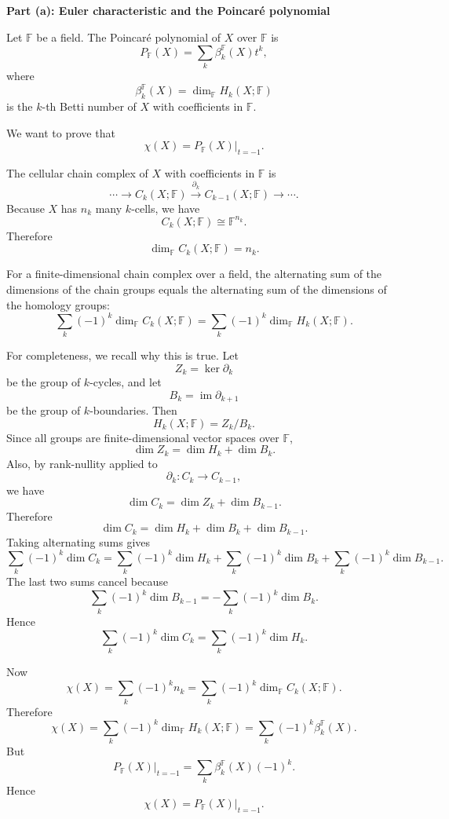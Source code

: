 \begin{solution}

\medskip
\noindent\textbf{Part (a): Euler characteristic and the Poincaré polynomial}\par
\smallskip


Let \(\mathbb F\) be a field. The Poincaré polynomial of \(X\) over \(\mathbb F\) is
\[
P_{\mathbb F}(X)
=
\sum_k \beta_k^{\mathbb F}(X)t^k,
\]
where
\[
\beta_k^{\mathbb F}(X)
=
\dim_{\mathbb F} H_k(X;\mathbb F)
\]
is the \(k\)-th Betti number of \(X\) with coefficients in \(\mathbb F\).

We want to prove that
\[
\chi(X)=P_{\mathbb F}(X)\big|_{t=-1}.
\]

The cellular chain complex of \(X\) with coefficients in \(\mathbb F\) is
\[
\cdots
\longrightarrow
C_k(X;\mathbb F)
\xrightarrow{\partial_k}
C_{k-1}(X;\mathbb F)
\longrightarrow
\cdots.
\]
Because \(X\) has \(n_k\) many \(k\)-cells, we have
\[
C_k(X;\mathbb F)\cong \mathbb F^{n_k}.
\]
Therefore
\[
\dim_{\mathbb F} C_k(X;\mathbb F)=n_k.
\]

For a finite-dimensional chain complex over a field, the alternating sum of the dimensions of the chain groups equals the alternating sum of the dimensions of the homology groups:
\[
\sum_k (-1)^k \dim_{\mathbb F} C_k(X;\mathbb F)
=
\sum_k (-1)^k \dim_{\mathbb F} H_k(X;\mathbb F).
\]

For completeness, we recall why this is true. Let
\[
Z_k=\ker \partial_k
\]
be the group of \(k\)-cycles, and let
\[
B_k=\operatorname{im}\partial_{k+1}
\]
be the group of \(k\)-boundaries. Then
\[
H_k(X;\mathbb F)=Z_k/B_k.
\]
Since all groups are finite-dimensional vector spaces over \(\mathbb F\),
\[
\dim Z_k=\dim H_k+\dim B_k.
\]
Also, by rank-nullity applied to
\[
\partial_k:C_k\to C_{k-1},
\]
we have
\[
\dim C_k=\dim Z_k+\dim B_{k-1}.
\]
Therefore
\[
\dim C_k
=
\dim H_k+\dim B_k+\dim B_{k-1}.
\]
Taking alternating sums gives
\[
\sum_k (-1)^k \dim C_k
=
\sum_k (-1)^k \dim H_k
+
\sum_k (-1)^k \dim B_k
+
\sum_k (-1)^k \dim B_{k-1}.
\]
The last two sums cancel because
\[
\sum_k (-1)^k \dim B_{k-1}
=
-\sum_k (-1)^k \dim B_k.
\]
Hence
\[
\sum_k (-1)^k \dim C_k
=
\sum_k (-1)^k \dim H_k.
\]

Now
\[
\chi(X)
=
\sum_k (-1)^k n_k
=
\sum_k (-1)^k \dim_{\mathbb F} C_k(X;\mathbb F).
\]
Therefore
\[
\chi(X)
=
\sum_k (-1)^k \dim_{\mathbb F} H_k(X;\mathbb F)
=
\sum_k (-1)^k \beta_k^{\mathbb F}(X).
\]
But
\[
P_{\mathbb F}(X)\big|_{t=-1}
=
\sum_k \beta_k^{\mathbb F}(X)(-1)^k.
\]
Hence
\[
\boxed{
	\chi(X)=P_{\mathbb F}(X)\big|_{t=-1}.}
\]



\end{solution}
